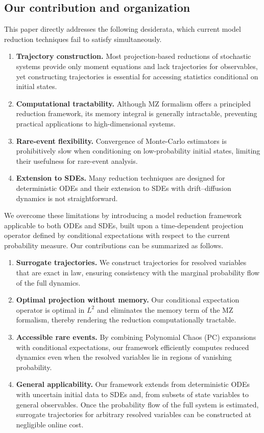 \documentclass[11pt, a4paper, oneside, reqno]{amsart}
\begin{document}
\subsection{Our contribution and organization}
\noindent This paper directly addresses the following desiderata, which current model reduction techniques fail to satisfy simultaneously.
\begin{enumerate}
\item {\bf Trajectory construction.} Most projection-based reductions of stochastic systems provide only moment equations and lack trajectories for observables, yet constructing trajectories is essential for accessing statistics conditional on initial states.
\item {\bf Computational tractability.} Although MZ formalism offers a principled reduction framework, its memory integral is generally intractable, preventing practical applications to high-dimensional systems.
\item {\bf Rare-event flexibility.} Convergence of Monte-Carlo estimators is prohibitively slow when conditioning on low-probability initial states, limiting their usefulness for rare-event analysis.
\item {\bf Extension to SDEs.}  Many reduction techniques are designed for deterministic ODEs and their extension to SDEs with drift–diffusion dynamics is not straightforward.
\end{enumerate}
We overcome these limitations by introducing a model reduction framework applicable to both ODEs and SDEs, built upon a time-dependent projection operator defined by conditional expectations with respect to the current probability measure. Our contributions can be summarized as follows.
\begin{enumerate}
\item {\bf Surrogate trajectories.} We construct trajectories for resolved variables that are exact in law, ensuring consistency with the marginal probability flow of the full dynamics. 
\item {\bf Optimal projection without memory.} Our conditional expectation operator is optimal in $L^2$ and eliminates the memory term of the MZ formalism, thereby rendering the reduction computationally tractable.
\item {\bf Accessible rare events.} By combining Polynomial Chaos (PC) expansions with conditional expectations, our framework efficiently computes reduced dynamics even when the resolved variables lie in regions of vanishing probability.
\item {\bf General applicability.} Our framework extends from deterministic ODEs with uncertain initial data to SDEs and, from subsets of state variables to general observables. Once the probability flow of the full system is estimated, surrogate trajectories for arbitrary resolved variables can be constructed at negligible online cost.
\end{enumerate}
\end{document}
